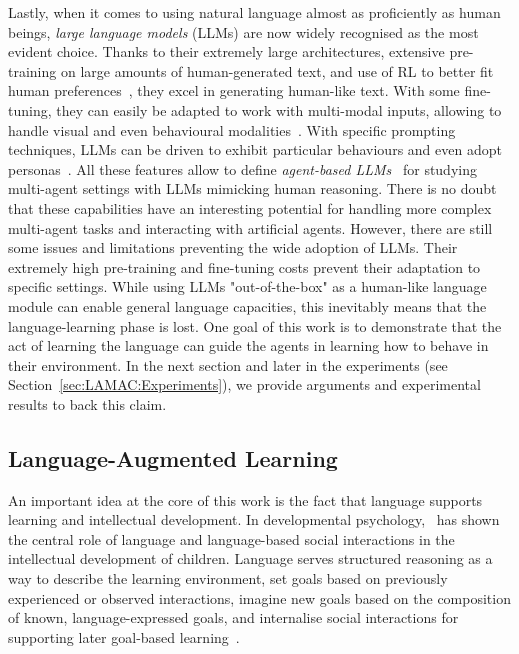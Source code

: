 Lastly, when it comes to using natural language almost as proficiently as human beings, \textit{large language models} (LLMs) are now widely recognised as the most evident choice. Thanks to their extremely large architectures, extensive pre-training on large amounts of human-generated text, and use of RL to better fit human preferences~\citep{Christiano2017_RLHF, Ouyang2022_InstructGPT}, they excel in generating human-like text. With some fine-tuning, they can easily be adapted to work with multi-modal inputs, allowing to handle visual and even behavioural modalities~\citep{Driess2023_PaLME}. With specific prompting techniques, LLMs can be driven to exhibit particular behaviours and even adopt personas~\citep{Li2023_CAMEL, Park2023_LLMtown, Perez2024_CulturalEvo}.
All these features allow to define \textit{agent-based LLMs}~\citep{Li2023_ToMLLM, Liu2024_HLA, Zhang2024_CoELA} for studying multi-agent settings with LLMs mimicking human reasoning. 
There is no doubt that these capabilities have an interesting potential for handling more complex multi-agent tasks and interacting with artificial agents. 
However, there are still some issues and limitations preventing the wide adoption of LLMs. Their extremely high pre-training and fine-tuning costs prevent their adaptation to specific settings. 
While using LLMs "out-of-the-box" as a human-like language module can enable general language capacities, this inevitably means that the language-learning phase is lost. One goal of this work is to demonstrate that the act of learning the language can guide the agents in learning how to behave in their environment. In the next section and later in the experiments (see Section~\ref{sec:LAMAC:Experiments}), we provide arguments and experimental results to back this claim. 







\subsection{Language-Augmented Learning}\label{sec:LAMAC:RW_LARL}

An important idea at the core of this work is the fact that language supports learning and intellectual development. In developmental psychology,~\citet{Vygotsky1934} has shown the central role of language and language-based social interactions in the intellectual development of children. Language serves structured reasoning as a way to describe the learning environment, set goals based on previously experienced or observed interactions, imagine new goals based on the composition of known, language-expressed goals, and internalise social interactions for supporting later goal-based learning~\citep{Vygotsky1934, Piaget1952, Tomasello2009_Cultural, Lupyan2012_WhatWordsDo}. 

